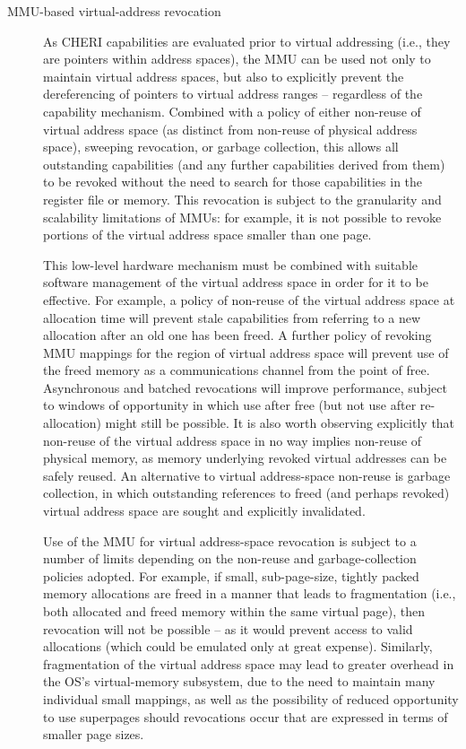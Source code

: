 \begin{description}
\item[MMU-based virtual-address revocation]
  As CHERI capabilities are evaluated prior to virtual addressing (i.e., they
  are pointers within address spaces), the MMU can be used not only to
  maintain virtual address spaces, but also to explicitly prevent the
  dereferencing of pointers to virtual address ranges -- regardless of the
  capability mechanism.
  Combined with a policy of either non-reuse of virtual address space (as
  distinct from non-reuse of physical address space), sweeping revocation, or
  garbage collection, this 
  allows all outstanding capabilities (and any further capabilities derived
  from them) to be revoked without the need to search for those capabilities
  in the register file or memory.
  This revocation is subject to the granularity and scalability limitations
  of MMUs: for example, it is not possible to revoke portions of the virtual
  address space smaller than one page.

  This low-level hardware mechanism must be combined with suitable software
  management of the virtual address space in order for it to be effective.
  For example, a policy of non-reuse of the virtual address space at
  allocation time will prevent stale capabilities from referring to a new
  allocation after an old one has been freed.
  A further policy of revoking MMU mappings for the region of virtual address
  space will prevent use of the freed memory as a communications channel from
  the point of free.
  Asynchronous and batched revocations will improve performance, subject to
  windows of opportunity in which use after free (but not use after
  re-allocation) might still be possible.
  It is also worth observing explicitly that non-reuse of the virtual address
  space in no way implies non-reuse of physical memory, as memory underlying
  revoked virtual addresses can be safely reused.
  An alternative to virtual address-space non-reuse is garbage collection, in
  which outstanding references to freed (and perhaps revoked) virtual address
  space are sought and explicitly invalidated.

  Use of the MMU for virtual address-space revocation is subject to a number
  of limits depending on the non-reuse and garbage-collection policies
  adopted.
  For example, if small, sub-page-size, tightly packed memory allocations
  are freed in a manner that leads to fragmentation (i.e., both allocated and
  freed memory within the same virtual page), then revocation will not be
  possible -- as it would prevent access to valid allocations (which could be
  emulated only at great expense).
  Similarly, fragmentation of the virtual address space may lead to greater
  overhead in the OS's virtual-memory subsystem, due to the need to maintain
  many individual small mappings, as well as the possibility of reduced
  opportunity to use superpages should revocations occur that are expressed
  in terms of smaller page sizes.


\end{description}

